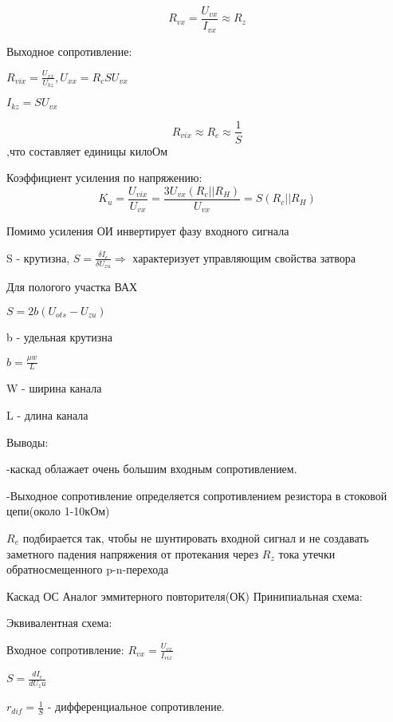 $$
R_{vx}=\frac{U_{vx}}{I_{vx}}\approx R_z
$$

Выходное сопротивление:

$R_{vix}=\frac{U_{xx}}{U_{kz}},   U_{xx}=R_cSU_{vx}$

$I_{kz}=SU_{vx}$

$$
R_{vix}\approx R_c\approx \frac1S
$$,что составляет единицы килоОм

Коэффициент усиления по напряжению:
$$
K_u=\frac{U_{vix}}{U_{vx}}=\frac{3U_{vx}(R_c||R_H)}{U_{vx}}=S(R_c||R_H)
$$

Помимо усиления ОИ инвертирует фазу входного сигнала

S - крутизна, $S=\frac{\delta I_c}{\delta U_{zu}}\Rightarrow$ характеризует управляющим свойства затвора

Для пологого участка ВАХ

$S=2b(U_{ots}-U_{zu})$

b - удельная крутизна

$b=\frac{\mu w}{L}$

W - ширина канала

L - длина канала

Выводы:

-каскад облажает очень большим входным сопротивлением.

-Выходное сопротивление определяется сопротивлением резистора в стоковой цепи(около 1-10кОм)

$R_e$ подбирается  так, чтобы не шунтировать входной сигнал и не создавать заметного падения напряжения от протекания через $R_z$ тока утечки обратносмещенного p-n-перехода

Каскад ОС
Аналог эммитерного повторителя(ОК)
Принипиальная схема:
\begin{center}
	\begin{figure}[h!]
	\end{figure}
\end{center}
\pagebreak
Эквивалентная схема:
\begin{center}
	\begin{figure}[h!]
	\end{figure}
\end{center}

Входное сопротивление:
$R_{vx}=\frac{U_{vx}}{I_{vix}}$

$S=\frac{dI_c}{dU_zu}$

$r_{dif}=\frac1S$ - дифференциальное сопротивление.

